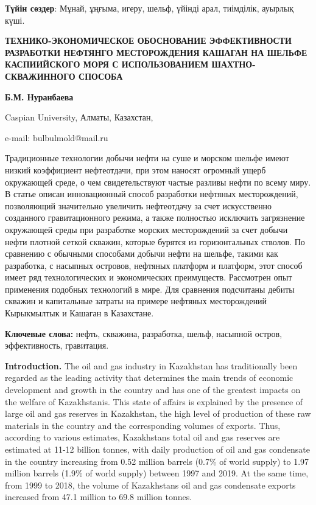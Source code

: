 {\bfseries Түйін сөздер}: Мұнай, ұңғыма, игеру, шельф, үйінді арал,
тиімділік, ауырлық күші.

{\bfseries ТЕХНИКО-ЭКОНОМИЧЕСКОЕ ОБОСНОВАНИЕ ЭФФЕКТИВНОСТИ РАЗРАБОТКИ
НЕФТЯНГО МЕСТОРОЖДЕНИЯ КАШАГАН НА ШЕЛЬФЕ КАСПИИЙСКОГО МОРЯ С
ИСПОЛЬЗОВАНИЕМ ШАХТНО-СКВАЖИННОГО СПОСОБА}

{\bfseries Б.М. Нуранбаева}

Caspian University, Алматы, Казахстан,

e-mail: bulbulmold@mail.ru

Традиционные технологии добычи нефти на суше и морском шельфе имеют
низкий коэффициент нефтеотдачи, при этом наносят огромный ущерб
окружающей среде, о чем свидетельствуют частые разливы нефти по всему
миру. В статье описан инновационный способ разработки нефтяных
месторождений, позволяющий значительно увеличить нефтеотдачу за счет
искусственно созданного гравитационного режима, а также полностью
исключить загрязнение окружающей среды при разработке морских
месторождений за счет добычи нефти плотной сеткой скважин, которые
бурятся из горизонтальных стволов. По сравнению с обычными способами
добычи нефти на шельфе, такими как разработка, с насыпных островов,
нефтяных платформ и платформ, этот способ имеет ряд технологических и
экономических преимуществ. Рассмотрен опыт применения подобных
технологий в мире. Для сравнения подсчитаны дебиты скважин и капитальные
затраты на примере нефтяных месторождений Кырыкмылтык и Кашаган в
Казахстане.

{\bfseries Ключевые слова:} нефть, скважина, разработка, шельф, насыпной
остров, эффективность, гравитация.

{\bfseries Introduction.} The oil and gas industry in Kazakhstan has
traditionally been regarded as the leading activity that determines the
main trends of economic development and growth in the country and has
one of the greatest impacts on the welfare of Kazakhstanis. This state
of affairs is explained by the presence of large oil and gas reserves in
Kazakhstan, the high level of production of these raw materials in the
country and the corresponding volumes of exports. Thus, according to
various estimates, Kazakhstan\textquotesingle s total oil and gas
reserves are estimated at 11-12 billion tonnes, with daily production of
oil and gas condensate in the country increasing from 0.52 million
barrels (0.7\% of world supply) to 1.97 million barrels (1.9\% of world
supply) between 1997 and 2019. At the same time, from 1999 to 2018, the
volume of Kazakhstan\textquotesingle s oil and gas condensate exports
increased from 47.1 million to 69.8 million tonnes.

